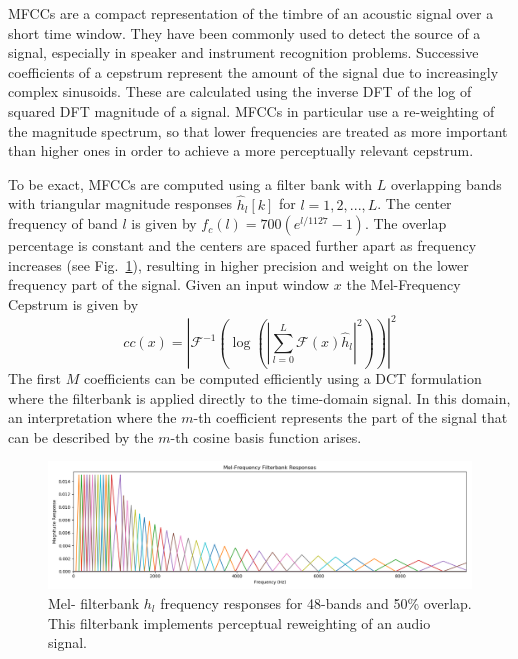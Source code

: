 MFCCs are a compact representation of the timbre of an acoustic signal over a short time window. They have been commonly used to detect the source of a signal, especially in speaker and instrument recognition problems. Successive coefficients of a cepstrum represent the amount of the signal due to increasingly complex sinusoids. These are calculated using the inverse DFT of the log of squared DFT magnitude of a signal. MFCCs in particular use a re-weighting of the magnitude spectrum, so that lower frequencies are treated as more important than higher ones in order to achieve a more perceptually relevant cepstrum.

To be exact, MFCCs are computed using a filter bank with $L$ overlapping bands with triangular magnitude responses $\hat{h}_{l}[k]$ for $l=1, 2, ..., L$. The center frequency of band $l$ is given by $f_c(l) = 700 (e^{l/1127} - 1)$. The overlap percentage is constant and the centers are spaced further apart as frequency increases (see Fig.~\ref{fig:audio-melbank}), resulting in higher precision and weight on the lower frequency part of the signal. Given an input window $x$ the Mel-Frequency Cepstrum is given by
\begin{equation}
    cc(x) = \left| \mathcal{F}^{-1} \left( \log\left( \left|
    \sum_{l=0}^L
    \mathcal{F} \left(x\right) \hat{h}_l
    \right|^2 \right) \right) \right|^2
\end{equation}
The first $M$ coefficients can be computed efficiently using a DCT formulation where the filterbank is applied directly to the time-domain signal. In this domain, an interpretation where the $m$-th coefficient represents the part of the signal that can be described by the $m$-th cosine basis function arises.

\begin{figure}
    \centering
    \includegraphics[width=\textwidth]{figures/audio/mel-responses.png}
    \caption{Mel- filterbank $h_l$ frequency responses for 48-bands and 50\% overlap. This filterbank implements perceptual reweighting of an audio signal.}
    \label{fig:audio-melbank}
\end{figure}

